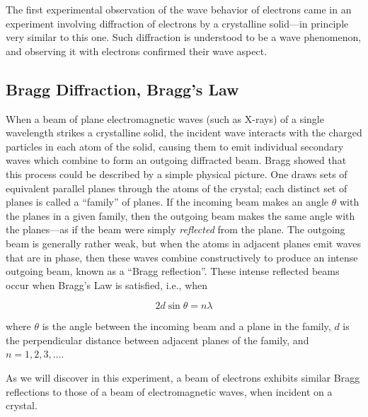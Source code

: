 \documentclass{tufte-handout}
\begin{document}
The first experimental observation of the wave behavior of electrons came in an
experiment involving diffraction of electrons by a crystalline solid---in
principle very similar to this one. Such diffraction is understood to be a wave
phenomenon, and observing it with electrons confirmed their wave aspect.

\subsection{Bragg Diffraction, Bragg's Law}

When a beam of plane electromagnetic waves (such as X-rays) of a single
wavelength strikes a crystalline solid, the incident wave interacts with the
charged particles in each atom of the solid, causing them to emit individual
secondary waves which combine to form an outgoing diffracted beam.  Bragg showed
that this process could be described by a simple physical picture.  One draws
sets of equivalent parallel planes through the atoms of the crystal; each
distinct set of planes is called a ``family'' of planes.  If the incoming beam
makes an angle $\theta$ with the planes in a given family, then the outgoing
beam makes the same angle with the planes---as if the beam were simply {\em
  reflected} from the plane.  The outgoing beam is generally rather weak, but
when the atoms in adjacent planes emit waves that are in phase, then these waves
combine constructively to produce an intense outgoing beam, known as a ``Bragg
reflection''.  These intense reflected beams occur when Bragg's Law is
satisfied, i.e., when

\begin{equation}
2 d \sin\theta = n\lambda
\label{eq:bragglaw}
\end{equation}

\noindent where $\theta$ is the angle between the incoming beam and a plane in
the family, $d$ is the perpendicular distance between adjacent planes of the
family, and $n = 1,2,3,\ldots$.

As we will discover in this experiment, a beam of electrons exhibits
similar Bragg reflections to those of a beam of electromagnetic waves,
when incident on a crystal.
\end{document}
